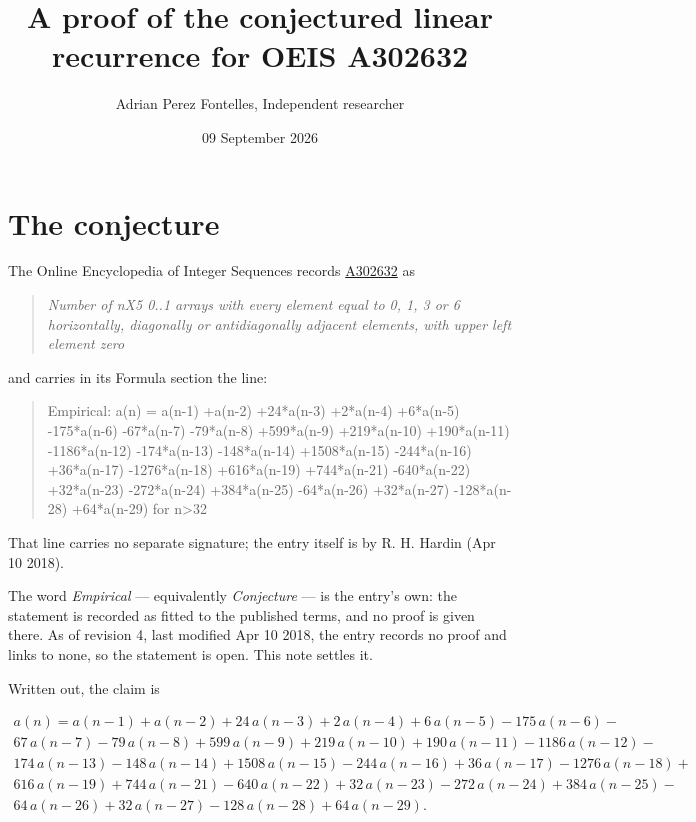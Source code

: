 \documentclass[11pt]{article}
\title{A proof of the conjectured linear recurrence for OEIS A302632}
\author{Adrian Perez Fontelles, Independent researcher}
\date{09 September 2026}
\theoremstyle{definition}
\begin{document}
\maketitle
\section{The conjecture}

The Online Encyclopedia of Integer Sequences records \href{https://oeis.org/A302632}{A302632} as

\begin{quote}\itshape Number of nX5 0..1 arrays with every element equal to 0, 1, 3 or 6 horizontally, diagonally or antidiagonally adjacent elements, with upper left element zero\end{quote}

and carries in its Formula section the line:

\begin{quote}\ttfamily Empirical: a(n) = a(n-1) +a(n-2) +24*a(n-3) +2*a(n-4) +6*a(n-5) -175*a(n-6) -67*a(n-7) -79*a(n-8) +599*a(n-9) +219*a(n-10) +190*a(n-11) -1186*a(n-12) -174*a(n-13) -148*a(n-14) +1508*a(n-15) -244*a(n-16) +36*a(n-17) -1276*a(n-18) +616*a(n-19) +744*a(n-21) -640*a(n-22) +32*a(n-23) -272*a(n-24) +384*a(n-25) -64*a(n-26) +32*a(n-27) -128*a(n-28) +64*a(n-29) for n>32\end{quote}

That line carries no separate signature; the entry itself is by R. H. Hardin (Apr 10 2018).

The word {\itshape Empirical} --- equivalently {\itshape Conjecture} --- is the entry's own: the statement is recorded as fitted to the published terms, and no proof is given there. As of revision 4, last modified Apr 10 2018, the entry records no proof and links to none, so the statement is open. This note settles it.

Written out, the claim is

\begin{multline*} a(n) = a(n-1) + a(n-2) + 24\,a(n-3) + 2\,a(n-4) + 6\,a(n-5) - 175\,a(n-6) - \\ 67\,a(n-7) - 79\,a(n-8) + 599\,a(n-9) + 219\,a(n-10) + 190\,a(n-11) - 1186\,a(n-12) - \\ 174\,a(n-13) - 148\,a(n-14) + 1508\,a(n-15) - 244\,a(n-16) + 36\,a(n-17) - 1276\,a(n-18) + \\ 616\,a(n-19) + 744\,a(n-21) - 640\,a(n-22) + 32\,a(n-23) - 272\,a(n-24) + 384\,a(n-25) - \\ 64\,a(n-26) + 32\,a(n-27) - 128\,a(n-28) + 64\,a(n-29). \end{multline*}
\end{document}
